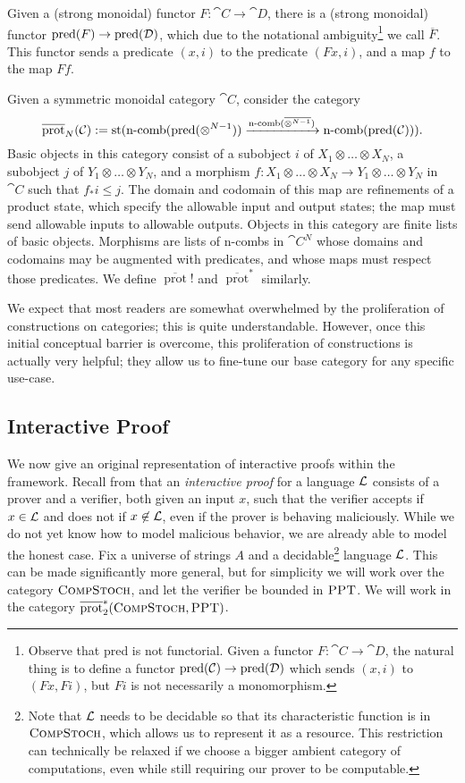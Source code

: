Given a (strong monoidal) functor $F: \cat{C}\to\cat{D}$, there is a (strong
monoidal) functor $\operatorname{pred}(F)\to\operatorname{pred}({\mathcal{D}})$, which due to the notational
ambiguity\footnote{ Observe that pred is not functorial. Given a functor $F:
  \cat{C}\to\cat{D}$, the natural thing is to define a functor
  $\operatorname{pred}({\mathcal{C}})\to\operatorname{pred}({\mathcal{D}})$ which sends $(x, i)$ to $(Fx, Fi)$, but $Fi$
is not necessarily a monomorphism. } we call $\overline{F}$. This functor sends
a predicate $(x, i)$ to the predicate $(Fx, i)$, and a map $f$ to the map $Ff$.

Given a symmetric monoidal category $\cat{C}$, consider the category \[
  \overline{\operatorname{prot}}_{N}({\mathcal{C}}) := \operatorname*{st}(\operatorname*{n-comb}(\operatorname{pred}(\otimes^{N-1}))\xrightarrow{\operatorname*{n-comb}(\overline{\otimes^{N-1}})}\operatorname*{n-comb}(\operatorname{pred}({\mathcal{C}}))).
\]
Basic objects in this category consist of a subobject $i$ of $X_1\otimes \dots\otimes
X_N$, a subobject $j$ of $Y_1\otimes \dots\otimes Y_N$, and a morphism
$f: X_1\otimes\dots\otimes X_N\to Y_1\otimes\dots\otimes Y_N$ in $\cat{C}$ such
that $f_*i\leq j$. The domain and codomain of this map are refinements of a
product state, which specify the allowable input and output states; the map must
send allowable inputs to allowable outputs. Objects in this category are finite
lists of basic objects. Morphisms are lists of n-combs in $\cat{C}^N$ whose
domains and codomains may be augmented with predicates, and whose maps must
respect those predicates. We define $\overline{\operatorname{prot}}!$ and
$\overline{\operatorname{prot}}^*$ similarly.

We expect that most readers are somewhat overwhelmed by the
proliferation of constructions on categories; this is quite understandable.
However, once this initial conceptual barrier is overcome, this proliferation of
constructions is actually very helpful; they allow us to fine-tune our base
category for any specific use-case.

\subsection{Interactive Proof}
\label{sec:interactive proof}

We now give an original representation of interactive proofs within the
framework. Recall from 
that an \emph{interactive proof} for a
language $\mathcal{L}$ consists of a prover and a verifier, both given an input $x$,
such that the verifier accepts if $x\in\mathcal{L}$ and does not if $x\not\in\mathcal{L}$, even
if the prover is behaving maliciously. While we do not yet know how to model
malicious behavior, we are already able to model the honest case. Fix a universe
of strings $A$ and a decidable\footnote{
  Note that $\mathcal{L}$ needs to be decidable so that its characteristic function is
  in ${\textsc{\text{CompStoch}}}$, which allows us to represent it as a resource. This
  restriction can technically be relaxed if we choose a bigger ambient category
  of computations, even while still requiring our prover to be computable.
} language $\mathcal{L}$. This can be made significantly more
general, but for simplicity we will work over the category ${\textsc{\text{CompStoch}}}$,
and let the verifier be bounded in ${\textsc{\text{PPT}}}$. We will work in the category
$\overline{\operatorname{prot}}^*_{2}({\textsc{\text{CompStoch}}}, {\textsc{\text{PPT}}})$.

